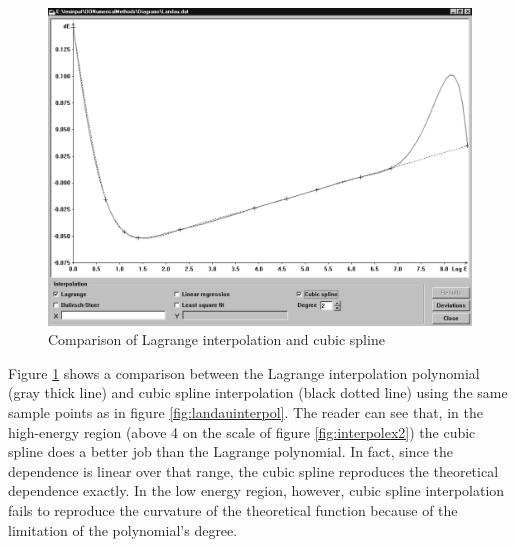 \documentclass[twoside]{book}
\begin{document}
\begin{figure}
\label{fig:interpolex3}
\centering\includegraphics[width=12cm]{Figures/LagrangeVsSpline}
\caption{Comparison of Lagrange interpolation and cubic spline}
\end{figure}
Figure \ref{fig:interpolex3} shows a comparison between the
Lagrange interpolation polynomial (gray thick line) and cubic
spline interpolation (black dotted line) using the same sample
points as in figure \ref{fig:landauinterpol}. The reader can see
that, in the high-energy region (above 4 on the scale of figure
\ref{fig:interpolex2}) the cubic spline does a better job than the
Lagrange polynomial. In fact, since the dependence is linear over
that range, the cubic spline reproduces the theoretical dependence
exactly. In the low energy region, however, cubic spline
interpolation fails to reproduce the curvature of the theoretical
function because of the limitation of the polynomial's degree.
\end{document}
